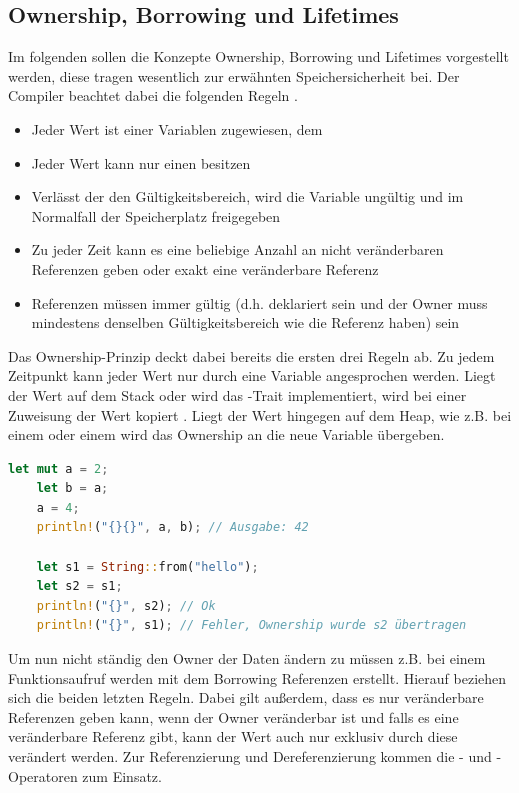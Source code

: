 \documentclass[11pt,a4paper, ngerman]{article}
\begin{document}
\subsection{Ownership, Borrowing und Lifetimes}
Im folgenden sollen die Konzepte Ownership, Borrowing und Lifetimes vorgestellt werden, diese tragen wesentlich zur erwähnten Speichersicherheit bei. Der Compiler beachtet dabei die folgenden Regeln \cite{Rules1} \cite{Rules2}.

\begin{itemize}
    \item Jeder Wert ist einer Variablen zugewiesen, dem 
    \item Jeder Wert kann nur einen  besitzen
    \item Verlässt der  den Gültigkeitsbereich, wird die Variable ungültig und im Normalfall der Speicherplatz freigegeben
    \item Zu jeder Zeit kann es eine beliebige Anzahl an nicht veränderbaren Referenzen geben oder exakt eine veränderbare Referenz
    \item Referenzen müssen immer gültig (d.h. deklariert sein und der Owner muss mindestens denselben Gültigkeitsbereich wie die Referenz haben) sein
\end{itemize}

Das Ownership-Prinzip deckt dabei bereits die ersten drei Regeln ab. Zu jedem Zeitpunkt kann jeder Wert nur durch eine Variable angesprochen werden. Liegt der Wert auf dem Stack oder wird das -Trait implementiert, wird bei einer Zuweisung der Wert kopiert \cite{CopyTraitOwner}. Liegt der Wert hingegen auf dem Heap, wie z.B. bei einem  oder einem  wird das Ownership an die neue Variable übergeben.

\begin{lstlisting}[language=rust, caption={ownership}]
    let mut a = 2;
    let b = a;
    a = 4;
    println!("{}{}", a, b); // Ausgabe: 42

    let s1 = String::from("hello");
    let s2 = s1;
    println!("{}", s2); // Ok
    println!("{}", s1); // Fehler, Ownership wurde s2 übertragen
\end{lstlisting}

Um nun nicht ständig den Owner der Daten ändern zu müssen z.B. bei einem Funktionsaufruf werden mit dem Borrowing Referenzen erstellt. Hierauf beziehen sich die beiden letzten Regeln. Dabei gilt außerdem, dass es nur veränderbare Referenzen geben kann, wenn der Owner veränderbar ist und falls es eine veränderbare Referenz gibt, kann der Wert auch nur exklusiv durch diese verändert werden. Zur Referenzierung und Dereferenzierung kommen die \codeword{&}- und \codeword{*}-Operatoren zum Einsatz.
\end{document}
